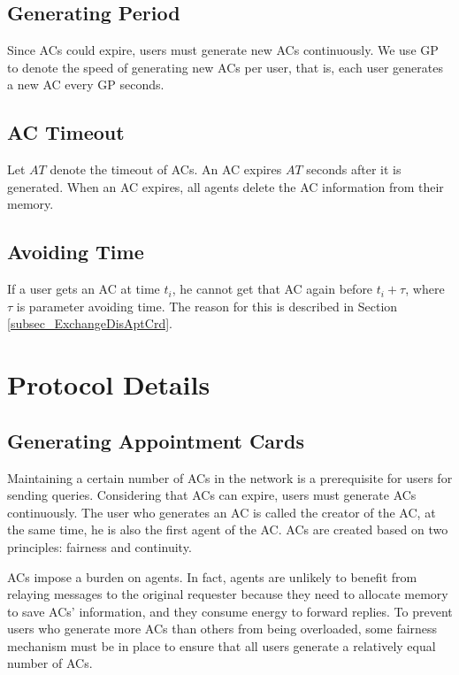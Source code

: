 \subsection{ Generating Period}

\noindent Since ACs could expire, users must generate new ACs continuously. We use GP to denote the speed of generating new ACs per user, that is, each user generates a new AC every GP seconds.


\subsection{ AC Timeout}

\noindent Let $AT$ denote the timeout of ACs. An AC expires $AT$ seconds after it is generated. When an AC expires, all agents delete the AC information from their memory.


\subsection{ Avoiding Time}

\noindent If a user gets an AC at time $t_i$, he cannot get that AC again before $t_i+\tau $, where $\tau$ is parameter avoiding time. The reason for this is described in Section \ref{subsec_ExchangeDisAptCrd}.


\section{ Protocol Details}


\subsection{ Generating Appointment Cards}

\noindent Maintaining a certain number of ACs in the network is a prerequisite for users for sending queries. Considering that ACs can expire, users must generate ACs continuously. The user who generates an AC is called the creator of the AC, at the same time, he is also the first agent of the AC. ACs are created based on two principles: fairness and continuity. 

ACs impose a burden on agents. In fact, agents are unlikely to benefit from relaying messages to the original requester because they need to allocate memory to save ACs' information, and they consume energy to forward replies. To prevent users who generate more ACs than others from being overloaded, some fairness mechanism must be in place to ensure that all users generate a relatively equal number of ACs.

